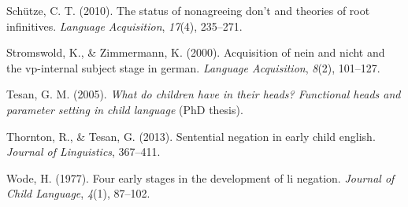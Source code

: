 \documentclass[man,floatsintext,draftall]{apa6}
\begin{document}
\leavevmode\hypertarget{ref-schutze2010status}{}%
Schütze, C. T. (2010). The status of nonagreeing don't and theories of root infinitives. \emph{Language Acquisition}, \emph{17}(4), 235--271.

\leavevmode\hypertarget{ref-StromswoldZimmermann2000}{}%
Stromswold, K., \& Zimmermann, K. (2000). Acquisition of nein and nicht and the vp-internal subject stage in german. \emph{Language Acquisition}, \emph{8}(2), 101--127.

\leavevmode\hypertarget{ref-tesan2005children}{}%
Tesan, G. M. (2005). \emph{What do children have in their heads? Functional heads and parameter setting in child language} (PhD thesis).

\leavevmode\hypertarget{ref-thorntonTesan2013}{}%
Thornton, R., \& Tesan, G. (2013). Sentential negation in early child english. \emph{Journal of Linguistics}, 367--411.

\leavevmode\hypertarget{ref-wode1977four}{}%
Wode, H. (1977). Four early stages in the development of li negation. \emph{Journal of Child Language}, \emph{4}(1), 87--102.
\end{document}
